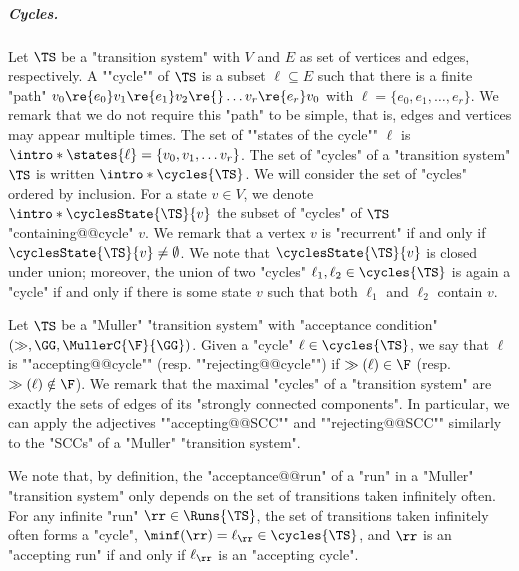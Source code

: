 \documentclass{theoretics}
\begin{document}
\subparagraph*{Cycles.} Let $\TS$ be a "transition system" with $V$ and $E$ as set of vertices and edges, respectively. A ""cycle"" of $\TS$ is a subset $\ell \subseteq E$ such that there is a finite "path" $v_0 \re {e_0}v_1 \re {e_1}v_2 \re{} \dots v_r \re {e_r} v_0$ with $\ell = \{e_0, e_1, \dots, e_r\}$. 
We remark that we do not require this "path" to be simple, that is, edges and vertices may appear multiple times. 
\AP The set of ""states of the cycle"" $\ell$ is $\intro*\states{\ell} = \{v_0, v_1, \dots v_r\}$. 
\AP The set of "cycles" of a "transition system" $\TS$ is written $\intro*\cycles{\TS}$. 
We will consider the set of "cycles" ordered by inclusion.
\AP For a state $v\in V$, we denote $\intro*\cyclesState{\TS}{v}$ the subset of "cycles" of $\TS$ "containing@@cycle" $v$.
We remark that a vertex $v$ is "recurrent" if and only if $\cyclesState{\TS}{v}\neq \emptyset$.
We note that $\cyclesState{\TS}{v}$ is closed under union; moreover, the union of two "cycles" $\ell_1, \ell_2\in \cycles{\TS}$ is again a "cycle" if and only if there is some state $v$ such that both $\ell_1$ and $\ell_2$ contain $v$.


Let $\TS$ be a "Muller" "transition system" with "acceptance condition" $(\gg, \GG, \MullerC{\F}{\GG})$.
\AP Given a "cycle" $\ell\in \cycles{\TS}$, we say that $\ell$ is ""accepting@@cycle"" (resp. ""rejecting@@cycle"") if $\gg(\ell) \in \F$ (resp. $\gg(\ell) \notin \F$). %
We remark that the maximal "cycles" of a "transition system" are exactly the sets of edges of its "strongly connected components". In particular, we can apply the adjectives ""accepting@@SCC"" and ""rejecting@@SCC"" similarly to the "SCCs" of a "Muller" "transition system".

We note that, by definition, the "acceptance@@run" of a "run" in a "Muller" "transition system" only depends on the set of transitions taken infinitely often. For any infinite "run" $\rr \in \Runs{\TS}$, the set of transitions taken infinitely often forms a "cycle", $\minf(\rr) = \ell_\rr\in \cycles{\TS}$, and $\rr$ is an "accepting run" if and only if $\ell_\rr$ is an "accepting cycle". 
\end{document}

